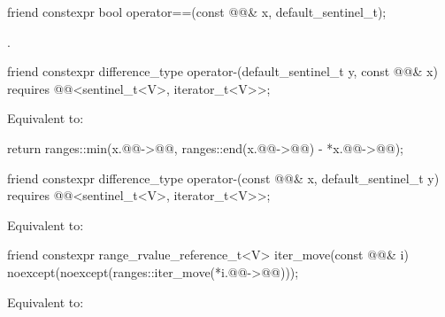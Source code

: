 %
\begin{itemdecl}
friend constexpr bool operator==(const @@& x, default_sentinel_t);
\end{itemdecl}

\begin{itemdescr}
\pnum
\returns
{}.
\end{itemdescr}

%
\begin{itemdecl}
friend constexpr difference_type operator-(default_sentinel_t y, const @@& x)
  requires @@<sentinel_t<V>, iterator_t<V>>;
\end{itemdecl}

\begin{itemdescr}
\pnum
\effects
Equivalent to:
\begin{codeblock}
return ranges::min(x.@@->@@,
                   ranges::end(x.@@->@@) - *x.@@->@@);
\end{codeblock}
\end{itemdescr}

%
\begin{itemdecl}
friend constexpr difference_type operator-(const @@& x, default_sentinel_t y)
  requires @@<sentinel_t<V>, iterator_t<V>>;
\end{itemdecl}

\begin{itemdescr}
\pnum
\effects
Equivalent to: 
\end{itemdescr}

%
\begin{itemdecl}
friend constexpr range_rvalue_reference_t<V> iter_move(const @@& i)
  noexcept(noexcept(ranges::iter_move(*i.@@->@@)));
\end{itemdecl}

\begin{itemdescr}
\pnum
\effects
Equivalent to: 
\end{itemdescr}

